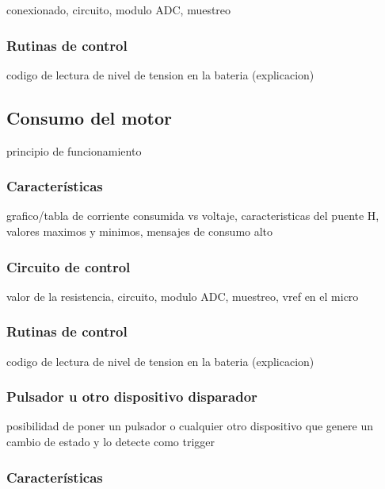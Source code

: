 conexionado, circuito, modulo ADC, muestreo

\subsubsection{Rutinas de control}
\label{h_sensado_bateria_rutina}

codigo de lectura de nivel de tension en la bateria (explicacion)

\subsection{Consumo del motor}
\label{h_sensado_consumo}

principio de funcionamiento

\subsubsection{Caracter\'isticas}
\label{h_sensado_consumo_caracteristicas}

grafico/tabla de corriente consumida vs voltaje, caracteristicas del puente H, valores maximos y minimos, mensajes de consumo alto

\subsubsection{Circuito de control}
\label{h_sensado_consumo_circuito}

valor de la resistencia, circuito, modulo ADC, muestreo, vref en el micro

\subsubsection{Rutinas de control}
\label{h_sensado_consumo_rutinas}

codigo de lectura de nivel de tension en la bateria (explicacion)

\subsubsection{Pulsador u otro dispositivo disparador}
\label{h_sensado_pulsador}

posibilidad de poner un pulsador o cualquier otro dispositivo que genere un cambio de estado y lo detecte como trigger

\subsubsection{Caracter\'isticas}
\label{h_sensado_pulsador_caracteristicas}


